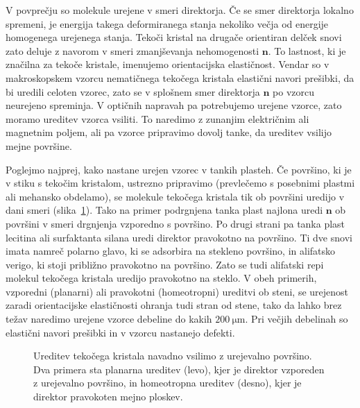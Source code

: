 V povprečju so molekule urejene v smeri direktorja. Če se smer direktorja lokalno
spremeni, je energija takega deformiranega 
stanja nekoliko večja od energije homogenega urejenega stanja. Tekoči kristal na
drugače orientiran delček snovi zato deluje z navorom v smeri zmanjševanja 
nehomogenosti $\mathbf{n}$. To lastnost, ki je značilna za tekoče kristale,
imenujemo orientacijska elastičnost. Vendar so v makroskopskem vzorcu
nematičnega tekočega kristala elastični navori prešibki,
da bi uredili celoten vzorec, zato se v splošnem smer direktorja $\mathbf{n}$ 
po vzorcu neurejeno spreminja. V optičnih napravah pa potrebujemo urejene vzorce, zato
moramo ureditev vzorca vsiliti. To naredimo z zunanjim električnim ali magnetnim poljem, 
ali pa vzorce pripravimo dovolj tanke, da ureditev vsilijo mejne površine. 

Poglejmo najprej, kako nastane urejen vzorec v tankih plasteh. Če površino,
ki je v stiku s tekočim kristalom, ustrezno pripravimo (prevlečemo s posebnimi 
plastmi ali mehansko obdelamo), se molekule tekočega kristala tik ob površini uredijo
v dani smeri (slika~\ref{s7.20a}).
Tako na primer podrgnjena tanka plast najlona uredi $\mathbf{n}$ ob površini v smeri
drgnjenja vzporedno s površino. Po drugi strani pa tanka plast lecitina ali 
surfaktanta silana uredi direktor pravokotno na površino. Ti dve snovi imata namreč
polarno glavo, ki se adsorbira na stekleno površino, in alifatsko verigo, 
ki stoji približno pravokotno na površino. Zato se tudi alifatski repi molekul
tekočega kristala uredijo pravokotno na steklo. V obeh primerih, 
vzporedni (planarni) ali pravokotni (homeotropni) ureditvi ob steni, 
se urejenost zaradi orientacijske elastičnosti
ohranja tudi stran od stene, tako da lahko brez težav naredimo urejene
vzorce debeline do kakih $200~\si{\micro\metre}$. Pri večjih debelinah so elastični
navori prešibki in v vzorcu nastanejo defekti.
\begin{figure}[h]
\centering
\def\svgwidth{50truemm} 
\qquad
\def\svgwidth{54truemm} 

\caption{Ureditev tekočega kristala navadno vsilimo z urejevalno površino. Dva primera
sta planarna ureditev (levo), kjer je direktor vzporeden z urejevalno površino, in 
homeotropna ureditev (desno), kjer je direktor pravokoten mejno ploskev.}
\label{s7.20a}
\end{figure}
 
